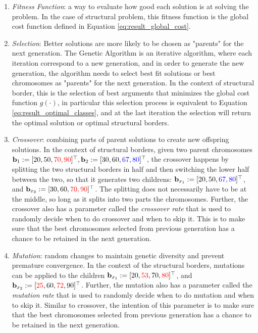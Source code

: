 \begin{enumerate}
    \item \textit{Fitness Function}: a way to evaluate how good each solution is at solving the problem. In the case of structural problem, this fitness function is the global cost function defined in Equation \ref{eq:result_global_cost}.
    \item \textit{Selection}: Better solutions are more likely to be chosen as "parents" for the next generation. The Genetic Algorithm is an iterative algorithm, where each iteration correspond to a new generation, and in order to generate the new generation, the algorithm needs to select best fit solutions or best chromosomes as "parents" for the next generation. In the context of structural border, this is the selection of best arguments that minimizes the global cost function $g(\cdot)$, in particular this selection process is equivalent to Equation \ref{eq:result_optimal_classes}, and at the last iteration the selection will return the optimal solution or optimal structural borders.
    \item \textit{Crossover}: combining parts of parent solutions to create new offspring solutions. In the context of structural borders, given two parent chromosomes $\mathbf{b}_1:=[20,50,\textcolor{red}{70,90}]^{\top}, \mathbf{b}_2:=[30,60,\textcolor{blue}{67,80}]^{\top}$, the crossover happens by splitting the two structural borders in half and then switching the lower half between the two, so that it generates two childrens: $\mathbf{b}_{x_1}:=[20,50,\textcolor{blue}{67,80}]^{\top}$, and $\mathbf{b}_{x_2}:=[30,60,\textcolor{red}{70,90}]^{\top}$. The splitting does not necessarily have to be at the middle, so long as it splits into two parts the chromosomes. Further, the crossover also has a parameter called the \textit{crossover rate} that is used to randomly decide when to do crossover and when to skip it. This is to make sure that the best chromosomes selected from previous generation has a chance to be retained in the next generation.
    \item \textit{Mutation}: random changes to maintain genetic diversity and prevent premature convergence. In the context of the structural borders, mutations can be applied to the children $\mathbf{b}_{x_1}:=[20,\textcolor{red}{53},70,\textcolor{red}{80}]^{\top}$, and $\mathbf{b}_{x_2}:=[\textcolor{red}{25},60,\textcolor{red}{72},90]^{\top}$. Further, the mutation also has a parameter called the \textit{mutation rate} that is used to randomly decide when to do mutation and when to skip it. Similar to crossover, the intention of this parameter is to make sure that the best chromosomes selected from previous generation has a chance to be retained in the next generation.

\end{enumerate}
